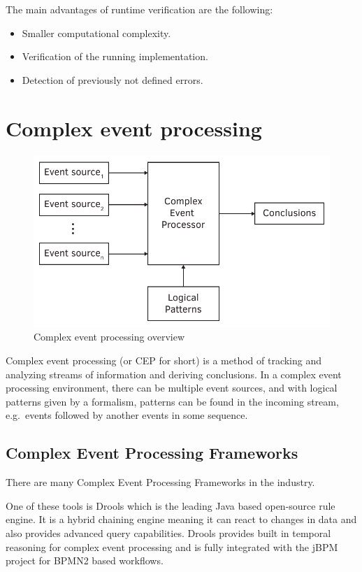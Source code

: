 The main advantages of runtime verification are the following:

\begin{itemize}
	\item Smaller computational complexity.
	\item Verification of the running implementation.
	\item Detection of previously not defined errors.
\end{itemize}



\section{Complex event processing}

\begin{figure}[h]
	\centering
	\includegraphics[width=0.6\linewidth]{figures/chapter_2/CEP}
	\caption{Complex event processing overview \redraw }
	\label{fig:intro:cep}
\end{figure}

Complex event processing (or CEP for short) is a method of tracking and analyzing streams of information and deriving conclusions. In a complex event processing environment, there can be multiple event sources, and with logical patterns given by a formalism, patterns can be found in the incoming stream, e.g.~events followed by another events in some sequence.

\subsection{Complex Event Processing Frameworks}
There are many Complex Event Processing Frameworks in the industry.

One of these tools is Drools\citep{drools} which is the leading Java based open-source rule engine. It is a hybrid chaining engine meaning it can react to changes in data and also provides advanced query capabilities. Drools provides built in temporal reasoning for complex event processing and is fully integrated with the jBPM project for BPMN2 based workflows.

